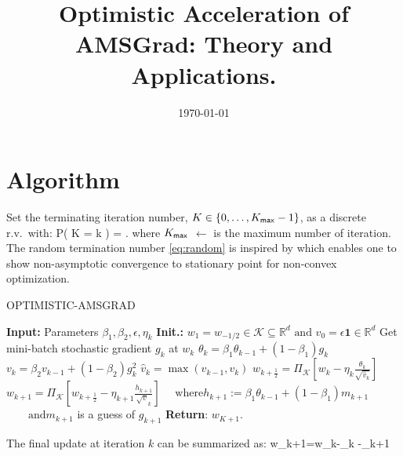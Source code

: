 \documentclass[11pt]{article}
\theoremstyle{k}
\begin{document}
\title{Optimistic Acceleration of AMSGrad: Theory and Applications.}
\date{\today}

\maketitle


\section{Algorithm}
Set the terminating iteration number, $K \in \{0,\dots,K_{\sf max}-1\}$, as a discrete r.v.~with:
\beq \label{eq:random}
   P( K = k ) = .
\eeq
where $K_{\sf max}$ $\leftarrow$ is the maximum number of iteration.
The random termination number \eqref{eq:random} is inspired by \citep{ghadimi2013stochastic} which enables one to show non-asymptotic convergence to stationary point for non-convex optimization. 

\begin{algorithm}[H]
\caption{OPTIMISTIC-AMSGRAD}\label{alg:sem}
  \begin{algorithmic}[1]
  \STATE \textbf{Input:} Parameters $\beta_{1}, \beta_{2}, \epsilon, \eta_{k}$
  \STATE \textbf{Init.:} $w_{1}=w_{-1 / 2} \in \mathcal{K} \subseteq \mathbb{R}^{d} \text { and } v_{0}=\epsilon \mathbf{1} \in \mathbb{R}^{d}$
  \STATE Get mini-batch stochastic gradient $g_{k}$ at $w_{k}$
   \STATE $\theta_{k}=\beta_{1} \theta_{k-1}+\left(1-\beta_{1}\right) g_{k}$
   \STATE $v_{k}=\beta_{2} v_{k-1}+\left(1-\beta_{2}\right) g_{k}^{2}$
   \STATE $ \hat{v}_{k}=\max \left(\hat{v}_{k-1}, v_{k}\right)$
   \STATE $ w_{k+\frac{1}{2}}=\Pi_{\mathcal{K}}\left[w_k-\eta_{k} \frac{\theta_{k}}{\sqrt{\hat{v}_{k}}}\right]$
   \STATE $ w_{k+1}=\Pi_{\mathcal{K}}\left[w_{k+\frac{1}{2}}-\eta_{k+1} \frac{h_{k+1}}{\sqrt{v}_{k}}\right]$
   \STATE $ \quad \text{where} h_{k+1}:=\beta_{1} \theta_{k-1} + (1-\beta_{1}) m_{k+1}$
      \STATE $ \quad\quad \text{and} m_{k+1}$ is a guess of $g_{k+1}$
\ENDFOR
\STATE \textbf{Return}: $w_{K+1}$.
  \end{algorithmic}
\end{algorithm}\vspace{.1cm}
The final update at iteration $k$ can be summarized as:
\beq\label{eq:finalupdate}
w_{k+1}=w_{k}-\eta_{k} -\eta_{k+1} 
\eeq
\end{document}
